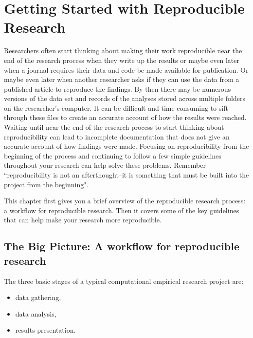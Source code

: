 



\chapter{Getting Started with Reproducible Research}\label{GettingStartedRR}

Researchers often start thinking about making their work reproducible near the end of the research process when they write up the results or maybe even later when a journal requires their data and code be made available for publication. Or maybe even later when another researcher asks if they can use the data from a published article to reproduce the findings. By then there may be numerous versions of the data set and records of the analyses stored across multiple folders on the researcher's computer. It can be difficult and time consuming to sift through these files to create an accurate account of how the results were reached. Waiting until near the end of the research process to start thinking about reproducibility can lead to incomplete documentation that does not give an accurate account of how findings were made. Focusing on reproducibility from the beginning of the process and continuing to follow a few simple guidelines throughout your research can help solve these problems. Remember ``reproducibility is not an afterthought--it is something that must be built into the project from the beginning"\cite[386]{Donoho2010}.

This chapter first gives you a brief overview of the reproducible research process: a workflow for reproducible research. Then it covers some of the key guidelines that can help make your research more reproducible.

\section{The Big Picture: A workflow for reproducible research}

The three basic stages of a typical computational empirical research project are:

\begin{itemize}
    \item data gathering,
    \item data analysis,
    \item results presentation.
\end{itemize}

